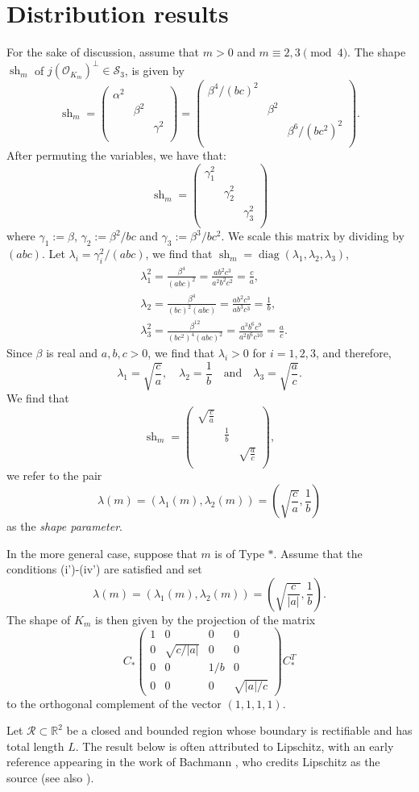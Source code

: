 \documentclass[table]{amsart}
\newcommand{\cO}{\mathcal{O}}
\newcommand{\op}[1]{\operatorname{#1}}
\newcommand\dmtx[3] { \left( {\begin{array}{ccc}
 #1 &  & \\
 & #2 & \\
 &  & #3 \\
 \end{array} } \right)}
\numberwithin{equation}{section}
\begin{document}
\section{Distribution results}\label{sec4}
\par For the sake of discussion, assume that $m>0$ and $m\equiv 2, 3\pmod{4}$. The shape $\op{sh}_{m}$ of  $j(\cO_{K_m})^\perp\in \mathcal{S}_3$, is given by \[\op{sh}_m=\dmtx{\alpha^2}{\beta^2}{\gamma^2}=\dmtx{\beta^4/(bc)^2}{\beta^2}{\beta^6/(bc^2)^2}.\] After permuting the variables, we have that:
\begin{equation*}\op{sh}_m=\dmtx{\gamma_1^2}{\gamma_2^2}{\gamma_3^2}\end{equation*}
where $\gamma_1:=\beta$, $\gamma_2:=\beta^2/bc$ and $\gamma_3:=\beta^3/bc^2$.
We scale this matrix by dividing by $(abc)$. Let $\lambda_i=\gamma_i^2/(abc)$, we find that $\op{sh}_m=\op{diag}\left(\lambda_1, \lambda_2, \lambda_3\right)$, 
\[\begin{split}
& \lambda_1^2= \frac{\beta^4}{(abc)^2}=\frac{ab^2c^3}{a^2b^2c^2}=\frac{c}{a},\\
& \lambda_2= \frac{\beta^4}{(bc)^2(abc)}=\frac{ab^2c^3}{ab^3c^3}=\frac{1}{b},\\
& \lambda_3^2=\frac{\beta^{12}}{(bc^2)^4(abc)^2}=\frac{a^3b^6c^9}{a^2b^{6}c^{10}}=\frac{a}{c}.
\end{split}\]
Since $\beta$ is real and $a,b,c>0$, we find that $\lambda_i>0$ for $i=1, 2, 3$, and therefore,
\[\lambda_1=\sqrt{\frac{c}{a}},\quad \lambda_2=\frac{1}{b}\quad \text{and}\quad \lambda_3=\sqrt{\frac{a}{c}}.\] We find that \[\op{sh}_m=\dmtx{\sqrt{\frac{c}{a}}}{\frac{1}{b}}{\sqrt{\frac{a}{c}}},\] we refer to the pair \begin{equation}\label{sh-parameter}\lambda(m)=(\lambda_1(m), \lambda_2(m))=\left(\sqrt{\frac{c}{a}}, \frac{1}{b}\right)\end{equation} as the \emph{shape parameter}. 
\par In the more general case, suppose that $m$ is of Type $\ast$. Assume that the conditions (i')-(iv') are satisfied and set 
\[\lambda(m)=(\lambda_1(m), \lambda_2(m))=\left(\sqrt{\frac{c}{|a|}}, \frac{1}{b}\right).\]
The shape of $K_m$ is then given by the projection of the matrix
$$
C_\ast \begin{pmatrix}
1 & 0 & 0 & 0 \\
0 & \sqrt{c/|a|} & 0 & 0 \\
0 & 0 & 1/b & 0 \\
0 & 0 & 0 & \sqrt{|a|/c}
\end{pmatrix} C_\ast^T
$$
\noindent to the orthogonal complement of the vector $(1, 1, 1, 1)$.
\par Let $\mathcal{R} \subset \mathbb{R}^2$ be a closed and bounded region whose boundary is rectifiable and has total length $L$. The result below is often attributed to Lipschitz, with an early reference appearing in the work of Bachmann \cite{bachmann1904analytische}, who credits Lipschitz as the source (see also \cite{Davenportlemma}).
\end{document}

